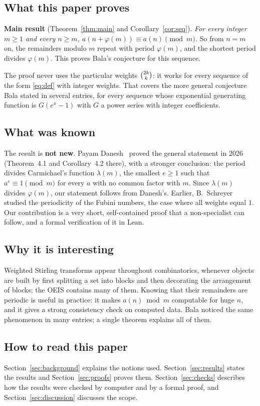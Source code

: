 \documentclass[11pt,a4paper]{article}
\theoremstyle{definition}
\theoremstyle{remark}
\begin{document}
\subsection{What this paper proves}
\textbf{Main result} (Theorem~\ref{thm:main} and Corollary~\ref{cor:seq}). \emph{For every integer $m\ge1$ and every
$n\ge m$, $a(n+\varphi(m))\equiv a(n)\pmod m$.} So from $n=m$ on, the remainders modulo $m$ repeat with period
$\varphi(m)$, and the shortest period divides $\varphi(m)$. This proves Bala's conjecture for this sequence.

The proof never uses the particular weights $\tbinom{2k}{k}$: it works for every sequence of the form \eqref{eq:def} with
integer weights. That covers the more general conjecture Bala stated in several entries, for every sequence whose
exponential generating function is $G(e^x-1)$ with $G$ a power series with integer coefficients.

\subsection{What was known}
The result is \textbf{not new}. Payam Danesh~\cite{danesh} proved the general statement in 2026 (Theorem~4.1 and
Corollary~4.2 there), with a stronger conclusion: the period divides Carmichael's function $\lambda(m)$, the smallest
$e\ge1$ such that $a^e\equiv1\pmod m$ for every $a$ with no common factor with $m$. Since $\lambda(m)$ divides
$\varphi(m)$, our statement follows from Danesh's. Earlier, B.~Schreyer~\cite{schreyer} studied the periodicity of the
Fubini numbers, the case where all weights equal $1$. Our contribution is a very short, self-contained proof that a
non-specialist can follow, and a formal verification of it in Lean.

\subsection{Why it is interesting}
Weighted Stirling transforms appear throughout combinatorics, whenever objects are built by first splitting a set into
blocks and then decorating the arrangement of blocks; the OEIS contains many of them. Knowing that their remainders are
periodic is useful in practice: it makes $a(n)\bmod m$ computable for huge $n$, and it gives a strong consistency check
on computed data. Bala noticed the same phenomenon in many entries; a single theorem explains all of them.

\subsection{How to read this paper}
Section~\ref{sec:background} explains the notions used. Section~\ref{sec:results} states the results and
Section~\ref{sec:proofs} proves them. Section~\ref{sec:checks} describes how the results were checked by computer and by a
formal proof, and Section~\ref{sec:discussion} discusses the scope.
\end{document}
